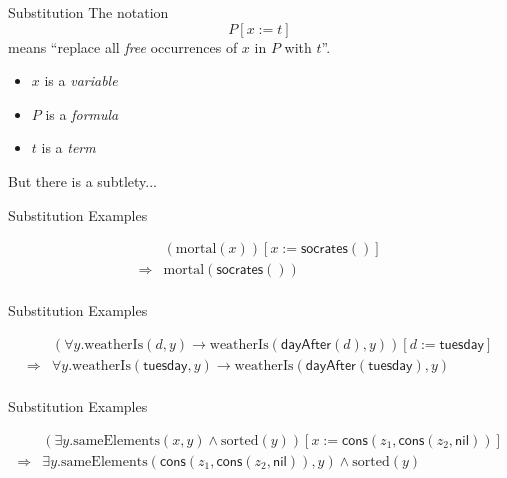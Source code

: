 \documentclass[xetex,aspectratio=169,14pt,hyperref={pdfpagelabels=true,pdflang={en-GB}}]{beamer}
\begin{document}
\begin{frame}
  {Substitution}
  The notation
  \begin{displaymath}
    P[x:=t]
  \end{displaymath}
  means ``replace all \emph{free} occurrences of $x$ in $P$ with $t$''.
  \begin{itemize}
  \item $x$ is a \emph{variable}
  \item $P$ is a \emph{formula}
  \item $t$ is a \emph{term}
  \end{itemize}


  \bigskip

  \textcolor{black!60}{But there is a subtlety...}
\end{frame}

\begin{frame}
  {Substitution Examples}

  \begin{displaymath}
    \begin{array}{cl}
      &(\mathrm{mortal}(x))[x := \mathsf{socrates}()]\\
      \Longrightarrow&\mathrm{mortal}(\mathsf{socrates}())\\
    \end{array}
  \end{displaymath}
\end{frame}

\begin{frame}
  {Substitution Examples}

  \begin{displaymath}
    \begin{array}{cl}
      &(\forall y. \mathrm{weatherIs}(d,y) \to \mathrm{weatherIs}(\mathsf{dayAfter}(d),y))[d:=\mathsf{tuesday}]\\
      \Longrightarrow&\forall y. \mathrm{weatherIs}(\mathsf{tuesday},y) \to \mathrm{weatherIs}(\mathsf{dayAfter}(\mathsf{tuesday}),y)\\
    \end{array}
  \end{displaymath}
\end{frame}

\begin{frame}
  {Substitution Examples}

  \begin{displaymath}
    \begin{array}{cl}
      &(\exists y. \mathrm{sameElements}(x,y) \land \mathrm{sorted}(y))[x:=\mathsf{cons}(z_1,\mathsf{cons}(z_2,\mathsf{nil}))]\\
      \Longrightarrow&\exists y. \mathrm{sameElements}(\mathsf{cons}(z_1,\mathsf{cons}(z_2,\mathsf{nil})),y) \land \mathrm{sorted}(y)\\
    \end{array}
  \end{displaymath}
\end{frame}
\end{document}
